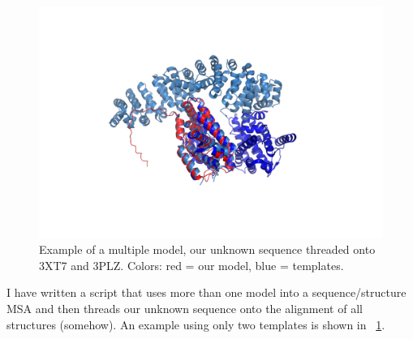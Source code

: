 \documentclass[12pt,a4paper,notitlepage,onecolumn]{article}
\title{\Title}
\author{\Author}
\date{\today}
\begin{document}
\maketitle

\begin{figure}[h!]
 \begin{center}
  \includegraphics[width=0.8\linewidth]{1yje_A-multiple_n_2.png}
  \caption{Example of a multiple model, our unknown sequence threaded onto 3XT7 and 3PLZ. Colors: red = our model, blue = templates.}
  \label{fig:1yje_A-multiple_n_2}
 \end{center}
\end{figure}
I have written a script that uses more than one model into a sequence/structure MSA and then threads our unknown sequence onto the alignment of all structures (somehow). An example using only two templates is shown in \figurename~\ref{fig:1yje_A-multiple_n_2}.
\end{document}
